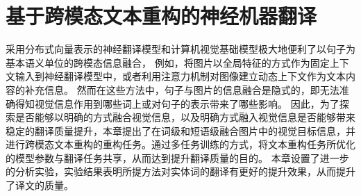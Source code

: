 \chapter{基于跨模态文本重构的神经机器翻译}

% 


采用分布式向量表示的神经翻译模型和计算机视觉基础模型极大地便利了以句子为基本语义单位的跨模态信息融合，
例如，将图片以全局特征的方式作为固定上下文输入到神经翻译模型中，或者利用注意力机制对图像建立动态上下文作为文本内容的补充信息。
然而在这些方法中，句子与图片的信息融合是隐式的，即无法准确得知视觉信息作用到哪些词上或对句子的表示带来了哪些影响。
因此，为了探索是否能够以明确的方式融合视觉信息，以及明确方式融入视觉信息是否能够带来稳定的翻译质量提升，本章提出了在词级和短语级融合图片中的视觉目标信息，并进行跨模态文本重构的重构任务。通过多任务训练的方式，将文本重构任务所优化的模型参数与翻译任务共享，从而达到提升翻译质量的目的。
本章设置了进一步的分析实验，实验结果表明所提方法对实体词的翻译有更好的提升效果，从而提升了译文的质量。

